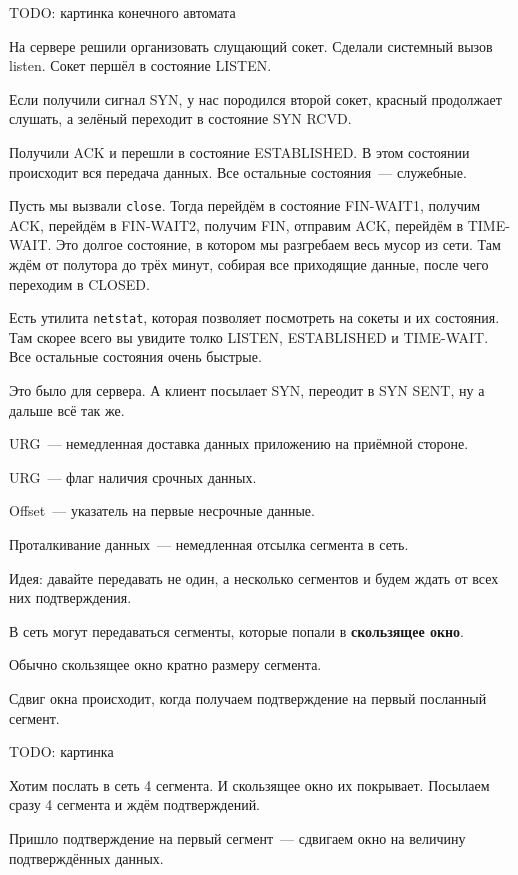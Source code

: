 TODO: картинка конечного автомата

На сервере решили организовать слущающий сокет. Сделали системный вызов listen. Сокет першёл в состояние LISTEN.

Если получили сигнал SYN, у нас породился второй сокет, красный продолжает слушать, а зелёный переходит в состояние SYN RCVD.

Получили ACK и перешли в состояние ESTABLISHED. В этом состоянии происходит вся передача данных. Все остальные состояния~--- служебные.

Пусть мы вызвали {\tt close}. Тогда перейдём в состояние FIN-WAIT1, получим ACK, перейдём в FIN-WAIT2, получим FIN, отправим ACK, перейдём в TIME-WAIT. Это долгое состояние, в котором мы разгребаем весь мусор из сети. Там ждём от полутора до трёх минут, собирая все приходящие данные, после чего переходим в CLOSED.

Есть утилита {\tt netstat}, которая позволяет посмотреть на сокеты и их состояния. Там скорее всего вы увидите толко LISTEN, ESTABLISHED и TIME-WAIT. Все остальные состояния очень быстрые.

Это было для сервера. А клиент посылает SYN, переодит в SYN SENT, ну а дальше всё так же.


URG~--- немедленная доставка данных приложению на приёмной стороне.

URG~--- флаг наличия срочных данных.

Offset~--- указатель на первые несрочные данные.

Проталкивание данных~--- немедленная отсылка сегмента в сеть. 


Идея: давайте передавать не один, а несколько сегментов и будем ждать от всех них подтверждения.

В сеть могут передаваться сегменты, которые попали в {\bf скользящее окно}.

Обычно скользящее окно кратно размеру сегмента.

Сдвиг окна происходит, когда получаем подтверждение на первый посланный сегмент.

TODO: картинка

Хотим послать в сеть 4 сегмента. И скользящее окно их покрывает. Посылаем сразу 4 сегмента и ждём подтверждений. 

Пришло подтверждение на первый сегмент~--- сдвигаем окно на величину подтверждённых данных.

